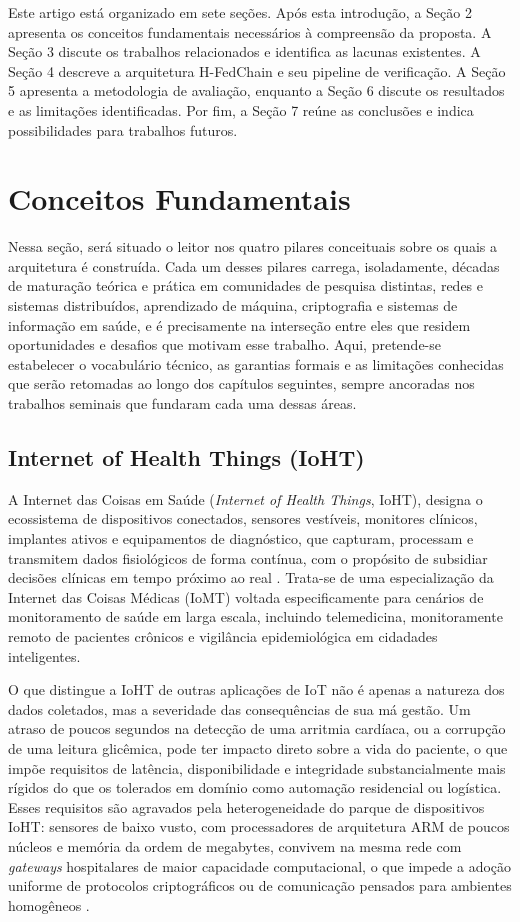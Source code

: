 \documentclass[12pt]{article}
\begin{document}
Este artigo está organizado em sete seções. Após esta introdução, a Seção 2 apresenta os conceitos fundamentais necessários à compreensão da proposta. A Seção 3 discute os trabalhos relacionados e identifica as lacunas existentes. A Seção 4 descreve a arquitetura H-FedChain e seu pipeline de verificação. A Seção 5 apresenta a metodologia de avaliação, enquanto a Seção 6 discute os resultados e as limitações identificadas. Por fim, a Seção 7 reúne as conclusões e indica possibilidades para trabalhos futuros.

\section{Conceitos Fundamentais}

Nessa seção, será situado o leitor nos quatro pilares conceituais sobre os quais a arquitetura é construída. Cada um desses pilares carrega, isoladamente, décadas de maturação teórica e prática em comunidades de pesquisa distintas, redes e sistemas distribuídos, aprendizado de máquina, criptografia e sistemas de informação em saúde, e é precisamente na interseção entre eles que residem oportunidades e desafios que motivam esse trabalho. Aqui, pretende-se estabelecer o vocabulário técnico, as garantias formais e as limitações conhecidas que serão retomadas ao longo dos capítulos seguintes, sempre ancoradas nos trabalhos seminais que fundaram cada uma dessas áreas.

\subsection{Internet of Health Things (IoHT)}

A Internet das Coisas em Saúde (\textit{Internet of Health Things}, IoHT), designa o ecossistema de dispositivos conectados, sensores vestíveis, monitores clínicos, implantes ativos e equipamentos de diagnóstico, que capturam, processam e transmitem dados fisiológicos de forma contínua, com o propósito de subsidiar decisões clínicas em tempo próximo ao real \cite{rajagopal2024leveraging}. Trata-se de uma especialização da Internet das Coisas Médicas (IoMT) voltada especificamente para cenários de monitoramento de saúde em larga escala, incluindo telemedicina, monitoramente remoto de pacientes crônicos e vigilância epidemiológica em cidadades inteligentes.

O que distingue a IoHT de outras aplicações de IoT não é apenas a natureza dos dados coletados, mas a severidade das consequências de sua má gestão. Um atraso de poucos segundos na detecção de uma arritmia cardíaca, ou a corrupção de uma leitura glicêmica, pode ter impacto direto sobre a vida do paciente, o que impõe requisitos de latência, disponibilidade e integridade substancialmente mais rígidos do que os tolerados em domínio como automação residencial ou logística. Esses requisitos são agravados pela heterogeneidade do parque de dispositivos IoHT: sensores de baixo vusto, com processadores de arquitetura ARM de poucos núcleos e memória da ordem de megabytes, convivem na mesma rede com \textit{gateways} hospitalares de maior capacidade computacional, o que impede a adoção uniforme de protocolos criptográficos ou de comunicação pensados para ambientes homogêneos \cite{awaisi2025hybrid}.
\end{document}
